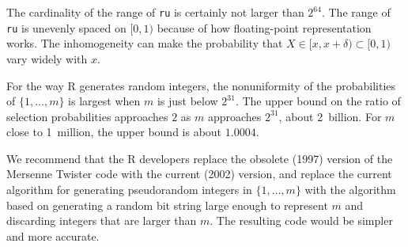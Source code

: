 \documentclass[12pt]{article}
\begin{document}
The cardinality of the range of \texttt{ru} is certainly not larger than $2^{64}$.
The range of \texttt{ru} is unevenly spaced on $[0, 1)$
because of how floating-point representation works.
The inhomogeneity can make the probability that $X \in [x, x+\delta) \subset [0, 1)$
vary widely with $x$.

For the way R generates random integers, the nonuniformity of the probabilities of 
$\{1, \ldots, m\}$ is largest when $m$ is just below $2^{31}$. 
The upper bound on the ratio of selection probabilities approaches $2$ as $m$
approaches $2^{31}$, about 2~billion. 
For $m$ close to 1~million, the upper bound is about $1.0004$.

We recommend that the R developers replace the obsolete (1997) version of the Mersenne Twister code with the current (2002) version, and replace the current algorithm for generating 
pseudorandom integers in $\{1, \ldots, m\}$ with the algorithm based on generating a random bit string large enough to represent $m$ and discarding integers that are larger than $m$.
The resulting code would be simpler and more accurate. 



\end{document}
